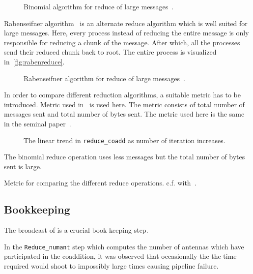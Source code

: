 \begin{figure}
	\label{fig:binreduce}
	\caption{Binomial algorithm for \mpi reduce of large messages~\cite{raben}.}
\end{figure}

\par Rabenseifner algorithm~\cite{raben} is an alternate reduce algorithm which is well suited for large messages.
Here, every process instead of reducing the entire message is only responsible for reducing a chunk of the message.
After which, all the processes send their reduced chunk back to root.
The entire process is visualized in~\autoref{fig:rabenreduce}.

\begin{figure}
	\label{fig:rabenreduce}
	\caption{Rabenseifner algorithm for \mpi reduce of large messages~\cite{raben}.}
\end{figure}


\par In order to compare different reduction algorithms, a suitable metric has to be introduced.
Metric used in~\cite{raben} is used here. The metric consists of total number of messages sent and total number of bytes sent.
The metric used here is the same in the seminal paper~\cite{raben}.

\begin{figure}
	\label{fig:reducelinear}
	\caption{The linear trend in \texttt{reduce\_coadd} as number of iteration increases.}
\end{figure}

\par The binomial reduce operation uses less messages but the total number of bytes sent is large.

\begin{table}
	\label{tab:reducemetric}
	\caption{Metric for comparing the different reduce operations. c.f. with~\cite{raben}.}
\end{table}

\subsection{Bookkeeping}
\label{ssub:bcast}


\par The broadcast of \mjd is a crucial book keeping step. 

\par In the \texttt{Reduce\_numant} step which computes the number of antennas which have participated in the coaddition,
it was observed that occasionally the the time required would shoot to impossibly large times causing pipeline failure.

